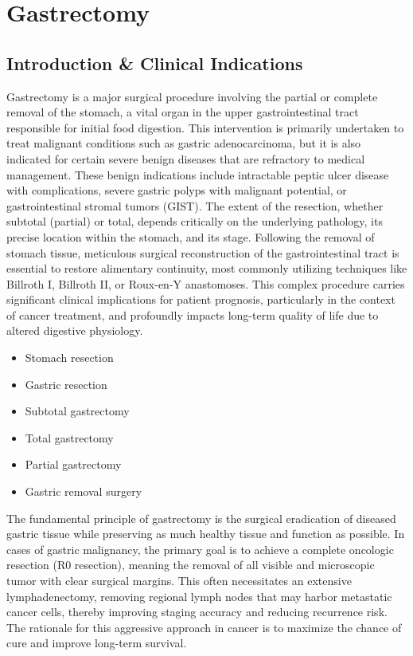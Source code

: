 \chapter{Gastrectomy}

\section*{Introduction \& Clinical Indications}
Gastrectomy is a major surgical procedure involving the partial or complete removal of the stomach, a vital organ in the upper gastrointestinal tract responsible for initial food digestion. This intervention is primarily undertaken to treat malignant conditions such as gastric adenocarcinoma, but it is also indicated for certain severe benign diseases that are refractory to medical management. These benign indications include intractable peptic ulcer disease with complications, severe gastric polyps with malignant potential, or gastrointestinal stromal tumors (GIST). The extent of the resection, whether subtotal (partial) or total, depends critically on the underlying pathology, its precise location within the stomach, and its stage. Following the removal of stomach tissue, meticulous surgical reconstruction of the gastrointestinal tract is essential to restore alimentary continuity, most commonly utilizing techniques like Billroth I, Billroth II, or Roux-en-Y anastomoses. This complex procedure carries significant clinical implications for patient prognosis, particularly in the context of cancer treatment, and profoundly impacts long-term quality of life due to altered digestive physiology.

\begin{itemize}
  \item Stomach resection
  \item Gastric resection
  \item Subtotal gastrectomy
  \item Total gastrectomy
  \item Partial gastrectomy
  \item Gastric removal surgery
\end{itemize}

The fundamental principle of gastrectomy is the surgical eradication of diseased gastric tissue while preserving as much healthy tissue and function as possible. In cases of gastric malignancy, the primary goal is to achieve a complete oncologic resection (R0 resection), meaning the removal of all visible and microscopic tumor with clear surgical margins. This often necessitates an extensive lymphadenectomy, removing regional lymph nodes that may harbor metastatic cancer cells, thereby improving staging accuracy and reducing recurrence risk. The rationale for this aggressive approach in cancer is to maximize the chance of cure and improve long-term survival.

